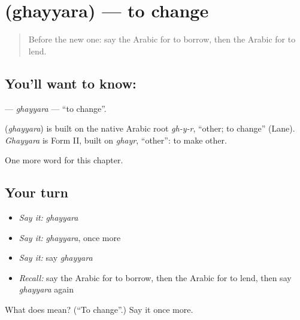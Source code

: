 \section[\texorpdfstring{\ar{غير} (ghayyara)}{غير (ghayyara)}]{ (ghayyara) — to change}

\label{lesson:AR-C224-ghayyara}



\begin{quote}
Before the new one: say the Arabic for to borrow, then the Arabic for to lend.
\end{quote}

\subsection*{You'll want to know: }
\textbf{} — \emph{ghayyara} — \textquotedblleft{}to change\textquotedblright{}.

\begin{cousinweb}
\textbf{} (\emph{ghayyara}) is built on the native Arabic root \emph{gh-y-r}, \textquotedblleft{}other; to change\textquotedblright{} (Lane). \emph{Ghayyara} is Form II, built on \emph{ghayr}, \textquotedblleft{}other\textquotedblright{}: to make other.
\end{cousinweb}

\begin{grammarlens}[title={What you've built}]
One more word for this chapter.
\end{grammarlens}

\subsection*{Your turn}
\begin{itemize}
\raggedright
  \item \emph{Say it:} \emph{ghayyara}
  \item \emph{Say it:} \emph{ghayyara}, once more
  \item \emph{Say it:} say \emph{ghayyara}
  \item \emph{Recall:} say the Arabic for to borrow, then the Arabic for to lend, then say \emph{ghayyara} again
\end{itemize}

\begin{tcolorbox}[breakable,colback=teal!4,colframe=teal!35!black,title={Before you move on}]
What does  mean? (\textquotedblleft{}To change\textquotedblright{}.) Say it once more.
\end{tcolorbox}

